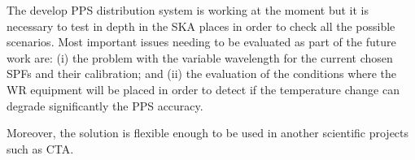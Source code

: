 The develop PPS distribution system is working at the moment but it is 
necessary to test in depth in the SKA places in order to check all the 
possible scenarios. Most important issues needing to be evaluated as part of 
the future work are: (i) the problem with the variable wavelength for the 
current chosen SPFs and their calibration; and (ii) the evaluation of the 
conditions where the WR equipment will be placed in order to detect if the 
temperature change can degrade significantly the PPS accuracy.

Moreover, the solution is flexible enough to be used in another scientific
projects such as CTA. 
